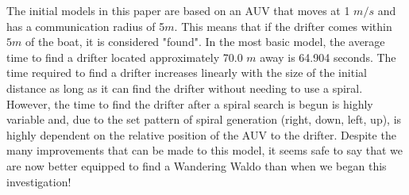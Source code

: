 \documentclass[a4paper, 11pt]{article} %
\begin{document}
The initial models in this paper are based on an AUV that moves at 1 $m/s$ and has a communication radius of 5$m$. This means that if the drifter comes within $5m$ of the boat, it is considered "found". In the most basic model, the average time to find a drifter located approximately 70.0 $m$ away is 64.904 seconds. The time required to find a drifter increases linearly with the size of the initial distance as long as it can find the drifter without needing to use a spiral. However, the time to find the drifter after a spiral search is begun is highly variable and, due to the set pattern of spiral generation (right, down, left, up), is highly dependent on the relative position of the AUV to the drifter. Despite the many improvements that can be made to this model, it seems safe to say that we are now better equipped to find a Wandering Waldo than when we began this investigation!

\newpage




\end{document}
